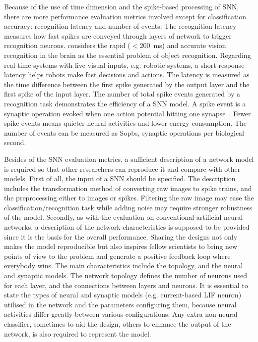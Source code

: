 \documentclass{frontiersENG} %
\begin{document}
Because of the use of time dimension and the spike-based processing of SNN, there are more performance evaluation metrics involved except for classification accuracy: recognition latency and number of events.
The recognition latency measures how fast spikes are conveyed through layers of network to trigger recognition neurons.
\cite{dicarlo2012does} considers the rapid ($<$200~ms) and accurate vision recognition in the brain as the essential problem of object recognition.
Regarding real-time systems with live visual inputs, e.g. robotic systems, a short response latency helps robots make fast decisions and actions.
The latency is measured as the time difference between the first spike generated by the output layer and the first spike of the input layer.
The number of total spike events generated by a recognition task demonstrates the efficiency of a SNN model.
A spike event is a synaptic operation evoked when one action potential hitting one synapse~\citep{sharp2012power}.
Fewer spike events means quieter neural activities and lower energy consumption.
The number of events can be measured as Sopbs, synaptic operations per biological second.

Besides of the SNN evaluation metrics, a sufficient description of a network model is required so that other researchers can reproduce it and compare with other models.
First of all, the input of a SNN should be specified.
The description includes the transformation method of converting raw images to spike trains, and the preprocessing either to images or spikes.
Filtering the raw image may ease the classification/recognition task while adding noise may require stronger robustness of the model.
Secondly, as with the evaluation on conventional artificial neural networks, a description of the network characteristics is supposed to be provided since it is the basis for the overall performance.
Sharing the designs not only makes the model reproducible but also inspires fellow scientists to bring new points of view to the problem and generate a positive feedback loop where everybody wins.
The main characteristics include the topology, and the neural and synaptic models.
The network topology defines the number of neurons used for each layer, and the connections between layers and neurons.
It is essential to state the types of neural and synaptic models (e.g. current-based LIF neuron) utilised in the network and the parameters configuring them, because neural activities differ greatly between various configurations.
Any extra non-neural classifier, sometimes to aid the design, others to enhance the output of the network, is also required to represent the model.
\end{document}
